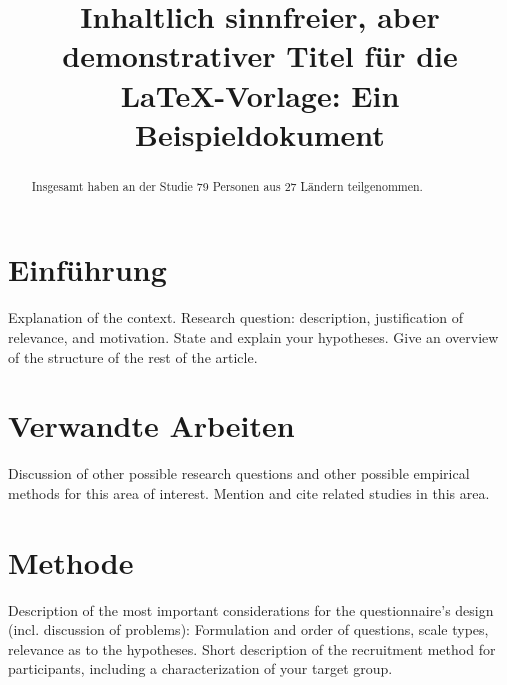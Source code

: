 \documentclass[de]{agse-empir-report}\usepackage[]{graphicx}\usepackage[]{color}
\begin{document}
\title{Inhaltlich sinnfreier, aber demonstrativer Titel für die
    \LaTeX-Vorlage: Ein Beispieldokument}
\author{
    \and
    \and
    \and
    \and
}

\maketitle



\begin{abstract}
    \lipsum[1]
    Insgesamt haben an der Studie 79 Personen
    aus 27 Ländern teilgenommen.
\end{abstract}


\section[fz]{Einführung}

Explanation of the context.
Research question: description, justification of relevance,
and motivation.
State and explain your hypotheses.
Give an overview of the structure of the rest of the article.

\lipsum[2]


\section[kk]{Verwandte Arbeiten}

Discussion of other possible research questions and other possible
empirical methods for this area of interest.
Mention and cite related studies in this area.

\lipsum[3]


\section[hs]{Methode}

Description of the most important considerations for the
questionnaire's design (incl. discussion of problems):
Formulation and order of questions, scale types, relevance as to the
hypotheses.
Short description of the recruitment method for participants,
including a characterization of your target group.
\end{document}
